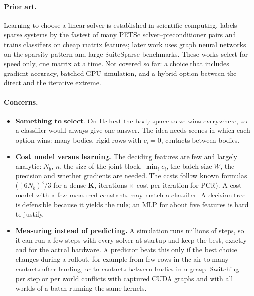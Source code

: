 \paragraph{Prior art.}
Learning to choose a linear solver is established in scientific
computing. \citet{sood2019iterative} labels sparse systems by the fastest
of many PETSc solver--preconditioner pairs and trains classifiers on cheap
matrix features; later work uses graph neural networks on the sparsity
pattern and large SuiteSparse benchmarks. These works select for speed
only, one matrix at a time. Not covered so far: a choice that includes
gradient accuracy, batched GPU simulation, and a hybrid option between the
direct and the iterative extreme.

\paragraph{Concerns.}
\begin{itemize}
  \item \textbf{Something to select.} On Helhest the body-space solve
    wins everywhere, so a classifier would always give one answer. The
    idea needs scenes in which each option wins: many bodies, rigid rows
    with $c_i = 0$, contacts between bodies.
  \item \textbf{Cost model versus learning.} The deciding features are
    few and largely analytic: $N_b$, $n$, the size of the joint block,
    $\min_i c_i$, the batch size $W$, the precision and whether gradients
    are needed. The costs follow known formulas ($(6N_b)^3/3$ for a dense
    $\mathbf{K}$, iterations $\times$ cost per iteration for PCR). A cost
    model with a few measured constants may match a classifier. A decision
    tree is defensible because it yields the rule; an MLP for about five
    features is hard to justify.
  \item \textbf{Measuring instead of predicting.} A simulation runs
    millions of steps, so it can run a few steps with every solver at
    startup and keep the best, exactly and for the actual hardware. A
    predictor beats this only if the best choice changes during a
    rollout, for example from few rows in the air to many contacts after
    landing, or to contacts between bodies in a grasp. Switching per step
    or per world conflicts with captured CUDA graphs and with all worlds
    of a batch running the same kernels.
\end{itemize}

